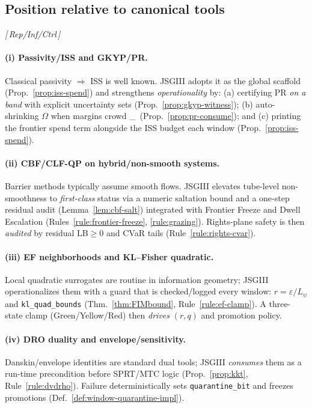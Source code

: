 \documentclass[10pt]{article}
\newcommand{\layertag}[1]{\textsf{\footnotesize[\,#1\,]}}
\newcommand{\cutq}{q}
\providecommand{\constsymPRmargin}{\varepsilon_{\mathrm{PR}}}
\begin{document}
\subsection{Position relative to canonical tools}\label{subsec:rel-canon}
\emph{\layertag{Rep/Inf/Ctrl}}

\paragraph{(i) Passivity/ISS and GKYP/PR.}
Classical passivity $\Rightarrow$ ISS is well known. JSGIII adopts it as the global scaffold (Prop.~\ref{prop:iss-spend}) and strengthens \emph{operationality} by: (a) certifying PR \emph{on a band} with explicit uncertainty sets (Prop.~\ref{prop:gkyp-witness}); (b) auto-shrinking $\Omega$ when margins crowd \constsymPRmargin\ (Prop.~\ref{prop:pr-consume}); and (c) printing the frontier spend term alongside the ISS budget each window (Prop.~\ref{prop:iss-spend}).

\paragraph{(ii) CBF/CLF-QP on hybrid/non-smooth systems.}
Barrier methods typically assume smooth flows. JSGIII elevates tube-level non-smoothness to \emph{first-class} status via a numeric saltation bound and a one-step residual audit (Lemma~\ref{lem:cbf-salt}) integrated with Frontier Freeze and Dwell Escalation (Rules~\ref{rule:frontier-freeze}, \ref{rule:grazing}). Rights-plane safety is then \emph{audited} by residual LB$\ge0$ and CVaR tails (Rule~\ref{rule:rights-cvar}).

\paragraph{(iii) EF neighborhoods and KL–Fisher quadratic.}
Local quadratic surrogates are routine in information geometry; JSGIII operationalizes them with a guard that is checked/logged every window: $r=\varepsilon/L_\psi$ and \texttt{kl\_quad\_bounds} (Thm.~\ref{thm:FIMbound}, Rule~\ref{rule:ef-clamp}). A three-state clamp (Green/Yellow/Red) then \emph{drives} $(r,\cutq)$ and promotion policy.

\paragraph{(iv) DRO duality and envelope/sensitivity.}
Danskin/envelope identities are standard dual tools; JSGIII \emph{consumes} them as a run-time precondition before SPRT/MTC logic (Prop.~\ref{prop:kkt}, Rule~\ref{rule:dvdrho}). Failure deterministically sets \texttt{quarantine\_bit} and freezes promotions (Def.~\ref{def:window-quarantine-impl}).
\end{document}
